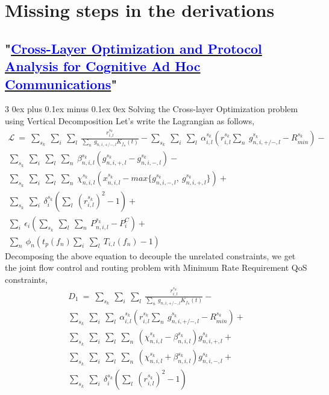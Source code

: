 \documentclass[12pt, draftcls, onecolumn]{IEEEtran}
\makeatletter
\def\subsubsection{\@startsection{subsubsection}%
                                 {3}%
                                 {\z@}%
                                 {0ex plus 0.1ex minus 0.1ex}%
                                 {0ex}%
                                 {\normalfont\normalsize\bfseries}}%
\makeatother
\begin{document}
\section{Missing steps in the derivations}\label{V}
\subsection{"\href{http://ieeexplore.ieee.org/stamp/stamp.jsp?tp=&arnumber=7859326&isnumber=7859429}{\textcolor{blue}{Cross-Layer Optimization and Protocol Analysis for Cognitive Ad Hoc Communications}}"}
\subsubsection{Solving the Cross-layer Optimization problem using Vertical Decomposition}
Let's write the Lagrangian as follows,
\begin{equation*}
    \begin{aligned}
        \mathcal{L}\ =\ \sum_{s_k}\ \sum_{i}\ \sum_{l}\ \frac{r_{i,l}^{s_k}}{\sum_{n}\ g_{n,i,+/-,l} K_{f_n}(t)} - \sum_{s_k}\ \sum_{i}\ \sum_{l}\ \alpha_{i,l}^{s_k}(r_{i,l}^{s_k}\sum_n\ g_{n,i,+/-,l}^{s_k} - R_{min}^{s_k}) - \\\sum_{s_k}\ \sum_{i}\ \sum_{l}\ \sum_{n}\ \beta_{n,i,l}^{s_k}(g_{n,i,+,l}^{s_k} - g_{n,i,-,l}^{s_k}) - \\\sum_{s_k}\ \sum_{i}\ \sum_{l}\ \sum_n\ \chi_{n,i,l}^{s_k}(x_{n,i,l}^{s_k} - max\{g_{n,i,-,l}^{s_k},\ g_{n,i,+,l}^{s_k}\}) + \\\sum_{s_k}\ \sum_{i}\ \delta_i^{s_k}(\sum_l\ (r_{i,l}^{s_k})^2 - 1) + \\\sum_i\ \epsilon_i(\sum_{s_k}\ \sum_l\ \sum_n\ P_{n,i,l}^{s_k} - P_i^C) + \\\sum_n\ \phi_n(t_p(f_n) \sum_i\ \sum_l\ T_{i,l}(f_n) - 1)
    \end{aligned}
\end{equation*}
Decomposing the above equation to decouple the unrelated constraints, we get the joint flow control and routing problem with Minimum Rate Requirement QoS constraints,
\begin{equation}
    \begin{aligned}\label{6}
        D_1\ =\ \sum_{s_k}\ \sum_{i}\ \sum_{l}\ \frac{r_{i,l}^{s_k}}{\sum_{n}\ g_{n,i,+/-,l} K_{f_n}(t)} - \\\sum_{s_k}\ \sum_{i}\ \sum_{l}\ \alpha_{i,l}^{s_k}(r_{i,l}^{s_k}\sum_n\ g_{n,i,+/-,l}^{s_k} - R_{min}^{s_k}) + \\\sum_{s_k}\ \sum_i\ \sum_l\ \sum_n\ (\chi_{n,i,l}^{s_k} - \beta_{n,i,l}^{s_k})g_{n,i,+,l}^{s_k} + \\\sum_{s_k}\ \sum_i\ \sum_l\ \sum_n\ (\chi_{n,i,l}^{s_k} + \beta_{n,i,l}^{s_k})g_{n,i,-,l}^{s_k} + \\\sum_{s_k}\ \sum_{i}\ \delta_i^{s_k}(\sum_l\ (r_{i,l}^{s_k})^2 - 1)
    \end{aligned}
\end{equation}
\end{document}

